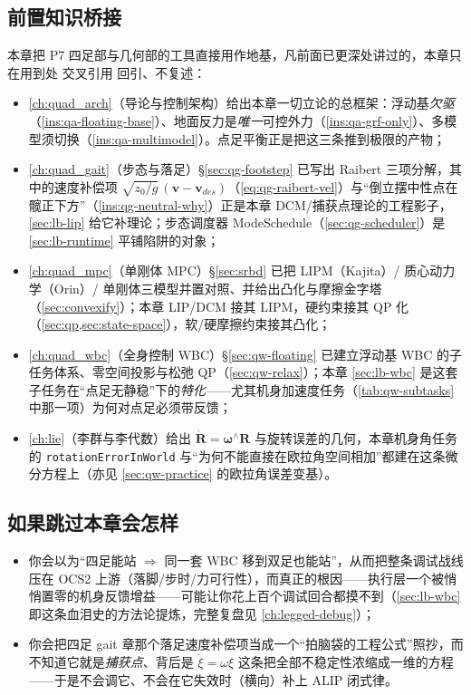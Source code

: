 \subsection*{前置知识桥接}
本章把 P7 四足部与几何部的工具直接用作地基，凡前面已更深处讲过的，本章只在用到处 交叉引用 回引、不复述：
\begin{itemize}
  \item \cref{ch:quad_arch}（导论与控制架构）给出本章一切立论的总框架：浮动基\emph{欠驱}（\cref{ins:qa-floating-base}）、地面反力是\emph{唯一}可控外力（\cref{ins:qa-grf-only}）、多模型须切换（\cref{ins:qa-multimodel}）。点足平衡正是把这三条推到极限的产物；
  \item \cref{ch:quad_gait}（步态与落足）§\ref{sec:qg-footstep} 已写出 Raibert 三项分解，其中的速度补偿项 $\sqrt{z_0/g}\,(\mathbf{v}-\mathbf{v}_{des})$（\cref{eq:qg-raibert-vel}）与“倒立摆中性点在髋正下方”（\cref{ins:qg-neutral-why}）正是本章 DCM/捕获点理论的工程影子，\cref{sec:lb-lip} 给它补理论；步态调度器 ModeSchedule（\cref{sec:qg-scheduler}）是 \cref{sec:lb-runtime} 平铺陷阱的对象；
  \item \cref{ch:quad_mpc}（单刚体 MPC）§\ref{sec:srbd} 已把 LIPM（Kajita）/ 质心动力学（Orin）/ 单刚体三模型并置对照、并给出凸化与摩擦金字塔（\cref{sec:convexify}）；本章 LIP/DCM 接其 LIPM，硬约束接其 QP 化（\cref{sec:qp,sec:state-space}），软/硬摩擦约束接其凸化；
  \item \cref{ch:quad_wbc}（全身控制 WBC）§\ref{sec:qw-floating} 已建立浮动基 WBC 的子任务体系、零空间投影与松弛 QP（\cref{sec:qw-relax}）；本章 \cref{sec:lb-wbc} 是这套子任务在“点足无静稳”下的\emph{特化}——尤其机身加速度任务（\cref{tab:qw-subtasks} 中那一项）为何对点足必须带反馈；
  \item \cref{ch:lie}（李群与李代数）给出 $\dot{\mathbf{R}}=\boldsymbol{\omega}^\wedge\mathbf{R}$ 与旋转误差的几何，本章机身角任务的 \texttt{rotationErrorInWorld} 与“为何不能直接在欧拉角空间相加”都建在这条微分方程上（亦见 \cref{sec:qw-practice} 的欧拉角误差变基）。
\end{itemize}

\subsection*{如果跳过本章会怎样}
\begin{itemize}
  \item 你会以为“四足能站 $\Rightarrow$ 同一套 WBC 移到双足也能站”，从而把整条调试战线压在 OCS2 上游（落脚/步时/力可行性），而真正的根因——执行层一个被悄悄置零的机身反馈增益——可能让你花上百个调试回合都摸不到（\cref{sec:lb-wbc} 即这条血泪史的方法论提炼，完整复盘见 \cref{ch:legged-debug}）；
  \item 你会把四足 gait 章那个落足速度补偿项当成一个“拍脑袋的工程公式”照抄，而不知道它就是\emph{捕获点}、背后是 $\dot\xi=\omega\xi$ 这条把全部不稳定性浓缩成一维的方程——于是不会调它、不会在它失效时（横向）补上 ALIP 闭式律。
\end{itemize}

